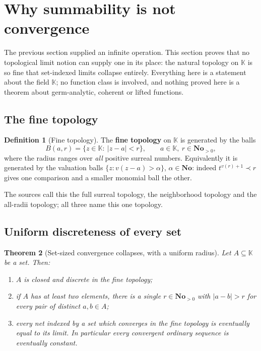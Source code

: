 \documentclass[11pt,a4paper]{article}
\numberwithin{equation}{section}
\newtheorem{theorem}{Theorem}[section]
\theoremstyle{definition}
\newtheorem{definition}[theorem]{Definition}
\theoremstyle{remark}
\theoremstyle{plain}
\newcommand{\K}{\mathbb K}
\newcommand{\No}{\mathbf{No}}
\newcommand{\tm}{t}
\newcommand{\abs}[1]{\lvert #1\rvert}
\begin{document}
\section{Why summability is not convergence}\label{a:sec:fine}

The previous section supplied an infinite operation.  This section
proves that no topological limit notion can supply one in its place:
the natural topology on $\K$ is so fine that set-indexed limits collapse
entirely.  Everything here is a statement about the field $\K$; no
function class is involved, and nothing proved here is a theorem about
germ-analytic, coherent or lifted functions.

\subsection{The fine topology}\label{a:sec:finedef}

\begin{definition}[Fine topology]\label{a:def:fine}
The \textbf{fine topology} on $\K$ is generated by the balls
\[
 B(a,r)=\{z\in\K:\ \abs{z-a}<r\},\qquad a\in\K,\ r\in\No_{>0},
\]
where the radius ranges over \emph{all} positive surreal numbers.
Equivalently it is generated by the valuation balls
$\{z:v(z-a)>\alpha\}$, $\alpha\in\No$: indeed
$\tm^{v(r)+1}\prec r$ gives one comparison and a smaller monomial ball
the other.
\end{definition}

The sources call this the full surreal topology, the neighborhood
topology and the all-radii topology; all three name this one topology.

\subsection{Uniform discreteness of every set}\label{a:sec:discrete}

\begin{theorem}[Set-sized convergence collapses, with a uniform
radius]\label{a:thm:discrete}
Let $A\subseteq\K$ be a \emph{set}.  Then:
\begin{enumerate}[label=\textup{(\roman*)},leftmargin=2.4em]
\item $A$ is closed and discrete in the fine topology;
\item if $A$ has at least two elements, there is a \emph{single}
$r\in\No_{>0}$ with $\abs{a-b}>r$ for \emph{every} pair of distinct
$a,b\in A$;
\item every net indexed by a set which converges in the fine topology is
eventually equal to its limit.  In particular every convergent ordinary
sequence is eventually constant.
\end{enumerate}
\end{theorem}
\end{document}
